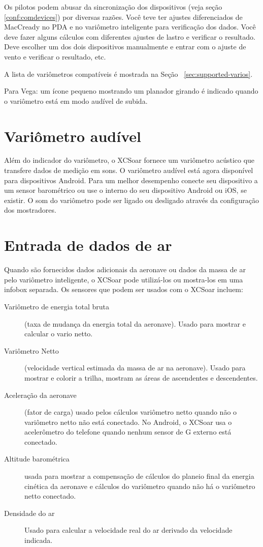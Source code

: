 Os pilotos podem abusar da sincronização dos dispositivos (veja seção \ref{conf:comdevices}) por diversas razões.  Você teve ter ajustes diferenciados de MacCready no PDA e no variômetro inteligente para verificação dos dados. Você deve fazer alguns cálculos com diferentes ajustes de lastro e verificar o resultado.  Deve escolher um dos dois dispositivos manualmente e entrar com o ajuste de vento e verificar o resultado, etc.

A lista de variômetros compatíveis é mostrada na Seção ~\ref{sec:supported-varios}.

Para Vega: um ícone pequeno mostrando um planador girando é indicado quando o variômetro está em modo audível de subida.

\section{Variômetro audível}

Além do indicador do variômetro, o XCSoar fornece um variômetro acústico que transfere dados de medição em sons.  O variômetro audível está agora disponível para dispositivos Android.  Para um melhor desempenho conecte seu dispositivo a um sensor barométrico ou use o interno do seu dispositivo Android ou iOS, se existir.  O som do variômetro pode ser ligado ou desligado através da configuração dos mostradores.


\section{Entrada de dados de ar}

Quando são fornecidos dados adicionais da aeronave ou dados da massa de ar pelo variômetro inteligente, o XCSoar pode utilizá-los ou mostra-los em uma infobox separada.  Os sensores que podem ser usados com o XCSoar incluem:
\begin{description}
\item[Variômetro de energia total bruta] (taxa de mudança da energia total da aeronave).  Usado para mostrar e calcular o vario netto.
\item[Variômetro Netto] (velocidade vertical estimada da massa de ar na aeronave).   Usado para mostrar e colorir a trilha, mostram as áreas de ascendentes e descendentes.
\item[Aceleração da aeronave] (fator de carga) usado pelos cálculos variômetro netto quando não o variômetro netto não está conectado.
No Android, o XCSoar usa o acelerômetro do telefone quando nenhum sensor de G externo está conectado. 
\item[Altitude barométrica] usada para mostrar a compensação de cálculos do planeio final da energia cinética da aeronave e cálculos do variômetro quando não há o variômetro netto conectado.
\item[Densidade do ar] Usado para calcular a velocidade real do ar derivado da velocidade indicada.
\end{description}

